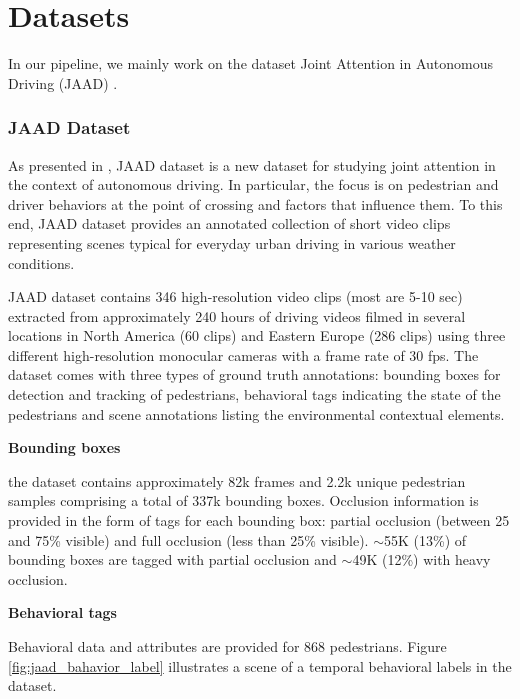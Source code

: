 \section{Datasets}
In our pipeline, we mainly work on the dataset Joint Attention in Autonomous Driving (JAAD) \cite{DBLP:journals/corr/KotserubaRT16}. 

\subsubsection{JAAD Dataset}

As presented in \cite{rasouli2017they}, JAAD dataset is a new dataset for studying joint attention in the context of autonomous driving. In particular, the focus is on pedestrian and driver behaviors at the point of crossing and factors that influence them. To this end, JAAD dataset provides an annotated collection of short video clips representing scenes typical for everyday urban driving in various weather conditions.

JAAD dataset contains 346 high-resolution video clips (most are 5-10 sec) extracted from approximately 240 hours of driving videos filmed in several locations in North America (60 clips) and Eastern Europe (286 clips) using three different high-resolution monocular cameras with a frame rate of 30 fps. The dataset comes with three types of ground truth annotations: bounding boxes for
detection and tracking of pedestrians, behavioral tags indicating the state of the pedestrians and scene annotations listing the environmental contextual elements. 

\textbf{Bounding boxes}

the dataset contains approximately 82k frames and 2.2k unique pedestrian samples comprising a total of 337k bounding boxes. Occlusion information is provided in the form of tags for each bounding box: partial occlusion (between 25 and 75\% visible) and full occlusion (less than 25\% visible). $\sim$55K (13\%) of bounding boxes are tagged with partial occlusion and $\sim$49K (12\%) with heavy occlusion.

\textbf{Behavioral tags}

Behavioral data and attributes are provided for 868 pedestrians. Figure \ref{fig:jaad_bahavior_label} illustrates a scene of a temporal behavioral labels in the dataset.

